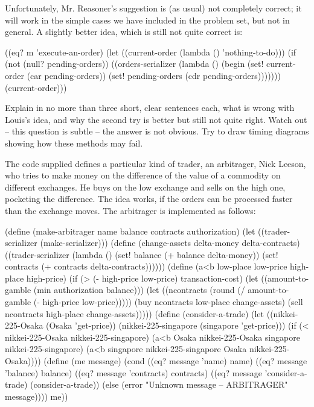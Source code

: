 Unfortunately, Mr. Reasoner's suggestion is (as usual) not completely
correct; it will work in the simple cases we have included in the
problem set, but not in general.  A slightly better idea, which is
still not quite correct is:

\beginlisp
     ((eq? m 'execute-an-order)
      (let ((current-order (lambda () 'nothing-to-do)))
        (if (not (null? pending-orders))
            ((orders-serializer
              (lambda ()
                (begin (set! current-order (car pending-orders))
                       (set! pending-orders (cdr pending-orders)))))))
        (current-order)))
\endlisp

Explain in no more than three short, clear sentences each, what is
wrong with Louis's idea, and why the second try is better but still
not quite right.  Watch out -- this question is subtle -- the answer
is not obvious.  Try to draw timing diagrams showing how these methods
may fail.

\bigskip

The code supplied defines a particular kind of trader, an arbitrager,
Nick Leeson, who tries to make money on the difference of the value of
a commodity on different exchanges.  He buys on the low exchange and
sells on the high one, pocketing the difference.  The idea works, if
the orders can be processed faster than the exchange moves.  The
arbitrager is implemented as follows:

\beginlisp
(define (make-arbitrager name balance contracts authorization)
  (let ((trader-serializer (make-serializer)))
    (define (change-assets delta-money delta-contracts)
      ((trader-serializer
        (lambda ()
          (set! balance (+ balance delta-money))
          (set! contracts (+ contracts delta-contracts))))))
    (define (a<b low-place low-price high-place high-price)
      (if (> (- high-price low-price) transaction-cost)
          (let ((amount-to-gamble (min authorization balance)))
            (let ((ncontracts
                   (round (/ amount-to-gamble (- high-price low-price)))))
              (buy ncontracts low-place change-assets)
              (sell ncontracts high-place change-assets)))))
    (define (consider-a-trade)
      (let ((nikkei-225-Osaka (Osaka 'get-price))
            (nikkei-225-singapore (singapore 'get-price)))
        (if (< nikkei-225-Osaka nikkei-225-singapore)
            (a<b Osaka nikkei-225-Osaka
                 singapore nikkei-225-singapore)
            (a<b singapore nikkei-225-singapore
                 Osaka nikkei-225-Osaka))))
    (define (me message)
      (cond ((eq? message 'name) name)
            ((eq? message 'balance) balance)
            ((eq? message 'contracts) contracts)
            ((eq? message 'consider-a-trade) (consider-a-trade))
            (else
             (error "Unknown message -- ARBITRAGER" message))))
    me))
\endlisp


